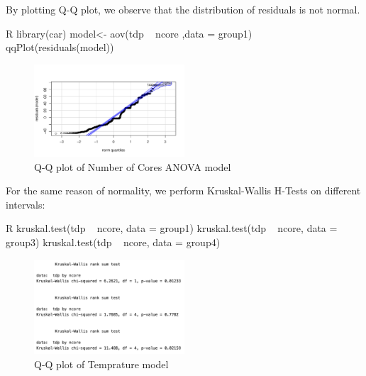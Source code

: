 
    By plotting Q-Q plot, we observe that the distribution of residuals is not normal.

\begin{code}{R}
    library(car)
    model<- aov(tdp ~ ncore ,data = group1)
    qqPlot(residuals(model))
\end{code}

\begin{figure}[H]
    \centering
    \includegraphics[width=0.5\textwidth]{./graphics/anova_ncore_qqplot.pdf}
    \caption{Q-Q plot of Number of Cores ANOVA model}
    \label{fig:anova_ncore_qqplot}
\end{figure}

    For the same reason of normality, we perform Kruskal-Wallis H-Tests on different intervals:

\begin{code}{R}
    kruskal.test(tdp ~ ncore, data = group1) 
    kruskal.test(tdp ~ ncore, data = group3)
    kruskal.test(tdp ~ ncore, data = group4)
\end{code}

\begin{figure}[H]
    \centering
    \includegraphics[width=0.5\textwidth]{./graphics/anova_ncore_test.png}
    \caption{Q-Q plot of Temprature model}
    \label{fig:anova_ncore_test}
\end{figure}

